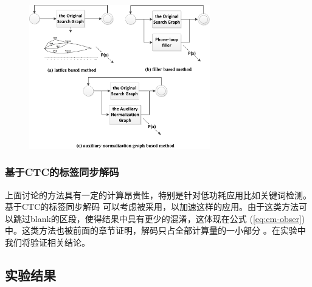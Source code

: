 \begin{figure}[!htp]
  \centering
    \captionstyle{\centering}
    \includegraphics[width=0.7\textwidth]{figure/graph_example.png}
\end{figure}

 \subsubsection{基于CTC的标签同步解码}
 \label{Sec:psd-ctc}

上面讨论的方法具有一定的计算昂贵性，特别是针对低功耗应用比如关键词检测。基于CTC的标签同步解码 \cite{Chen+2016} 可以考虑被采用，以加速这样的应用。由于这类方法可以跳过blank的区段，使得结果中具有更少的混淆，这体现在公式 (\ref{eq:cm-obser})中。这类方法也被前面的章节证明，解码只占全部计算量的一小部分 \cite{Chen+2016}\cite{zhc00-chen-tasl2017} 。在实验中我们将验证相关结论。

\subsection{实验结果}
\label{chap:unify-exp}



